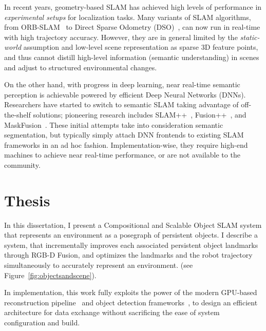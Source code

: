 In recent years, geometry-based SLAM has achieved high levels of performance in \textit{experimental setups} for localization tasks. Many variants of SLAM algorithms, from ORB-SLAM~\cite{mur-artalORBSLAM2OpenSourceSLAM2017} to Direct Sparse Odometry (DSO)~\cite{engelDirectSparseOdometry2018}, can now run in real-time with high trajectory accuracy.
However, they are in general limited by the \emph{static-world} assumption and low-level scene representation as sparse 3D feature points, and thus cannot distill high-level information (semantic understanding) in scenes and adjust to structured environmental changes.

On the other hand, with progress in deep learning, near real-time semantic perception is achievable powered by efficient Deep Neural Networks (DNNs).
Researchers have started to switch to semantic SLAM taking advantage of off-the-shelf solutions; pioneering research includes SLAM++~\cite{salas-morenoSLAMSimultaneousLocalisation2013}, Fusion++~\cite{mccormacFusionVolumetricObjectLevel2018}, and MaskFusion~\cite{runzMaskFusionRealTimeRecognition2018}. These initial attempts take into consideration semantic segmentation, but typically simply attach DNN frontends to existing SLAM frameworks in an ad hoc fashion. Implementation-wise, they require high-end machines to achieve near real-time performance, or are not available to the community.

\section{Thesis}
In this dissertation, I present a Compositional and Scalable Object SLAM system that represents an environment as a posegraph of persistent objects. I describe a system, that incrementally improves each associated persistent object landmarks through RGB-D Fusion, and optimizes the landmarks and the robot trajectory simultaneously to accurately represent an environment. (see Figure~\ref{fig:objectsandscene}).

In implementation, this work fully exploits the power of the modern GPU-based reconstruction pipeline~\cite{dongGPUAcceleratedRobust2019} and object detection frameworks~\cite{kirillovPointRendImageSegmentation2020}, to design an efficient architecture for data exchange without sacrificing the ease of system configuration and build.

